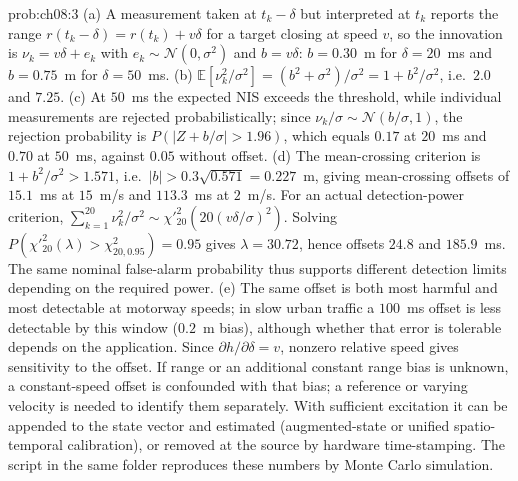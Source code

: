 \begin{sol}{prob:ch08:3}
(a) A measurement taken at $t_k-\delta$ but interpreted at $t_k$ reports the range $r(t_k-\delta)=r(t_k)+v\delta$ for a target closing at speed $v$, so the innovation is $\nu_k=v\delta+e_k$ with $e_k\sim\mathcal{N}(0,\sigma^2)$ and $b=v\delta$: $b=0.30$~m for $\delta=20$~ms and $b=0.75$~m for $\delta=50$~ms. (b) $\mathbb{E}[\nu_k^2/\sigma^2]=(b^2+\sigma^2)/\sigma^2=1+b^2/\sigma^2$, i.e.\ $2.0$ and $7.25$. (c) At $50$~ms the expected NIS exceeds the threshold, while individual measurements are rejected probabilistically; since $\nu_k/\sigma\sim\mathcal{N}(b/\sigma,1)$, the rejection probability is $P(\lvert Z+b/\sigma\rvert>1.96)$, which equals $0.17$ at $20$~ms and $0.70$ at $50$~ms, against $0.05$ without offset. (d) The mean-crossing criterion is $1+b^2/\sigma^2>1.571$, i.e.\ $\lvert b\rvert>0.3\sqrt{0.571}=0.227$~m, giving mean-crossing offsets of $15.1$~ms at $15$~m/s and $113.3$~ms at $2$~m/s. For an actual detection-power criterion, $\sum_{k=1}^{20}\nu_k^2/\sigma^2\sim\chi'^2_{20}(20(v\delta/\sigma)^2)$. Solving $P(\chi'^2_{20}(\lambda)>\chi^2_{20,0.95})=0.95$ gives $\lambda=30.72$, hence offsets $24.8$ and $185.9$~ms. The same nominal false-alarm probability thus supports different detection limits depending on the required power. (e) The same offset is both most harmful and most detectable at motorway speeds; in slow urban traffic a $100$~ms offset is less detectable by this window ($0.2$~m bias), although whether that error is tolerable depends on the application. Since $\partial h/\partial\delta=v$, nonzero relative speed gives sensitivity to the offset. If range or an additional constant range bias is unknown, a constant-speed offset is confounded with that bias; a reference or varying velocity is needed to identify them separately. With sufficient excitation it can be appended to the state vector and estimated (augmented-state or unified spatio-temporal calibration), or removed at the source by hardware time-stamping. The script  in the same folder reproduces these numbers by Monte Carlo simulation.
\end{sol}

